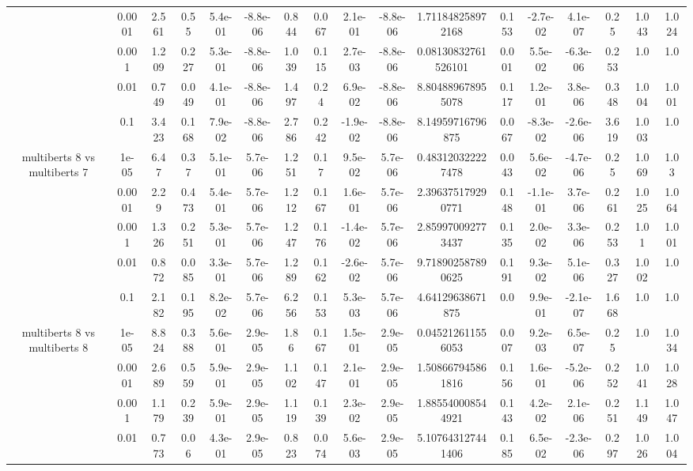 \begin{tabular}{|c|c|c|c|c|c|c|c|c|c|c|c|c|c|c|c|c|}
 & 0.0001 & 2.561 & 0.55 & 5.4e-01 & -8.8e-06 & 0.844 & 0.067 & 2.1e-01 & -8.8e-06 & 1.711848258972168 & 0.153 & -2.7e-02 & 4.1e-07 & 0.25 & 1.043 & 1.024 \\
 & 0.001 & 1.209 & 0.227 & 5.3e-01 & -8.8e-06 & 1.039 & 0.115 & 2.7e-03 & -8.8e-06 & 0.08130832761526101 & 0.001 & 5.5e-02 & -6.3e-06 & 0.253 & 1.0 & 1.0 \\
 & 0.01 & 0.749 & 0.049 & 4.1e-01 & -8.8e-06 & 1.497 & 0.24 & 6.9e-02 & -8.8e-06 & 8.804889678955078 & 0.117 & 1.2e-01 & 3.8e-06 & 0.348 & 1.004 & 1.001 \\
 & 0.1 & 3.423 & 0.168 & 7.9e-02 & -8.8e-06 & 2.786 & 0.242 & -1.9e-02 & -8.8e-06 & 8.14959716796875 & 0.067 & -8.3e-02 & -2.6e-06 & 3.619 & 1.003 & 1.0 \\
\hline
\multirow{5}{*}{multiberts 8 vs multiberts 7} & 1e-05 & 6.47 & 0.37 & 5.1e-01 & 5.7e-06 & 1.251 & 0.17 & 9.5e-02 & 5.7e-06 & 0.483120322227478 & 0.043 & 5.6e-02 & -4.7e-06 & 0.25 & 1.069 & 1.03 \\
 & 0.0001 & 2.29 & 0.473 & 5.4e-01 & 5.7e-06 & 1.212 & 0.167 & 1.6e-01 & 5.7e-06 & 2.396375179290771 & 0.148 & -1.1e-01 & 3.7e-06 & 0.261 & 1.025 & 1.064 \\
 & 0.001 & 1.326 & 0.251 & 5.3e-01 & 5.7e-06 & 1.247 & 0.176 & -1.4e-02 & 5.7e-06 & 2.859970092773437 & 0.135 & 2.0e-02 & 3.3e-06 & 0.253 & 1.01 & 1.001 \\
 & 0.01 & 0.872 & 0.085 & 3.3e-01 & 5.7e-06 & 1.289 & 0.162 & -2.6e-02 & 5.7e-06 & 9.718902587890625 & 0.191 & 9.3e-02 & 5.1e-06 & 0.327 & 1.002 & 1.0 \\
 & 0.1 & 2.182 & 0.195 & 8.2e-02 & 5.7e-06 & 6.256 & 0.153 & 5.3e-03 & 5.7e-06 & 4.64129638671875 & 0.0 & 9.9e-01 & -2.1e-07 & 1.668 & 1.0 & 1.0 \\
\hline
\multirow{5}{*}{multiberts 8 vs multiberts 8} & 1e-05 & 8.824 & 0.388 & 5.6e-01 & 2.9e-05 & 1.86 & 0.167 & 1.5e-01 & 2.9e-05 & 0.045212611556053 & 0.007 & 9.2e-03 & 6.5e-07 & 0.25 & 1.0 & 1.034 \\
 & 0.0001 & 2.689 & 0.559 & 5.9e-01 & 2.9e-05 & 1.102 & 0.147 & 2.1e-01 & 2.9e-05 & 1.508667945861816 & 0.156 & 1.6e-01 & -5.2e-06 & 0.252 & 1.041 & 1.028 \\
 & 0.001 & 1.179 & 0.239 & 5.9e-01 & 2.9e-05 & 1.119 & 0.139 & 2.3e-02 & 2.9e-05 & 1.885540008544921 & 0.143 & 4.2e-02 & 2.1e-06 & 0.251 & 1.149 & 1.047 \\
 & 0.01 & 0.773 & 0.06 & 4.3e-01 & 2.9e-05 & 0.823 & 0.074 & 5.6e-03 & 2.9e-05 & 5.107643127441406 & 0.185 & 6.5e-02 & -2.3e-06 & 0.297 & 1.026 & 1.004 \\

\end{tabular}
